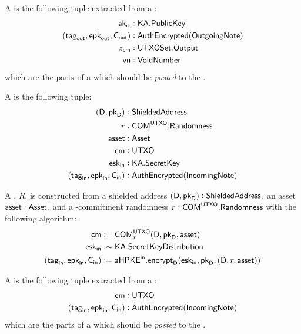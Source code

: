 \begin{definition}
    A \SenderPost{} is the following tuple extracted from a \Sender{}:
    \begin{align*}
        {\textsf{ak}}_\alpha                &: {\textsf{KA}}.{\textsf{PublicKey}} \\
        ({{\textsf{tag}}_{\textsf{out}}}, {{\textsf{epk}}_{\textsf{out}}}, {\textsf{C}_\textsf{out}}) &: {\textsf{AuthEncrypted}}({\textsf{OutgoingNote}}) \\
        z_{\textsf{cm}}                     &: {\textsf{UTXOSet}}.{\textsf{Output}} \\
        {\textsf{vn}}                       &: {\textsf{VoidNumber}}
    \end{align*}
    which are the parts of a \Sender{} which should be \emph{posted} to the \Ledger{}.
\end{definition}

\begin{definition}
    A \Receiver{} is the following tuple:
    \begin{align*}
        (\textsf{D}, {{\textsf{pk}}_\textsf{D}})     &: {\textsf{ShieldedAddress}} \\
        r                      &: {\textsf{COM}}^{\textsf{UTXO}}.{\textsf{Randomness}} \\
        {\textsf{asset}}                 &: {\textsf{Asset}} \\
        {\textsf{cm}}                    &: {\textsf{UTXO}} \\
        {{\textsf{esk}}_\textsf{in}}                 &: {\textsf{KA}}.{\textsf{SecretKey}} \\
        ({{\textsf{tag}}_\textsf{in}}, {{\textsf{epk}}_\textsf{in}}, {\textsf{C}_\textsf{in}}) &: {\textsf{AuthEncrypted}}({\textsf{IncomingNote}})
    \end{align*}
    
    A \Receiver{}, $R$, is constructed from a shielded address $(\textsf{D}, {{\textsf{pk}}_\textsf{D}}) : {\textsf{ShieldedAddress}}$, an asset ${\textsf{asset}} : {\textsf{Asset}}$, and a \UTXO{}-commitment randomness $r : {\textsf{COM}}^{\textsf{UTXO}}.{\textsf{Randomness}}$ with the following algorithm:
    \begin{align*}
        {\textsf{cm}}                    &:= {\textsf{COM}}^{{\textsf{UTXO}}}_r(\textsf{D}, {{\textsf{pk}}_\textsf{D}}, {\textsf{asset}}) \\
        {{\textsf{esk}}_\textsf{in}}                 &:\sim {\textsf{KA}}.{\textsf{SecretKeyDistribution}} \\
        ({{\textsf{tag}}_\textsf{in}}, {{\textsf{epk}}_\textsf{in}}, {\textsf{C}_\textsf{in}}) &:= {{\textsf{aHPKE}}^\textsf{in}}.{\textsf{encrypt}}_\textsf{D}({{\textsf{esk}}_\textsf{in}}, {{\textsf{pk}}_\textsf{D}}, (\textsf{D}, r, {\textsf{asset}}))
    \end{align*}
\end{definition}

\begin{definition}
    A \ReceiverPost{} is the following tuple extracted from a \Receiver{}:
    \begin{align*}
        {\textsf{cm}}                    &: {\textsf{UTXO}} \\
        ({{\textsf{tag}}_\textsf{in}}, {{\textsf{epk}}_\textsf{in}}, {\textsf{C}_\textsf{in}}) &: {\textsf{AuthEncrypted}}({\textsf{IncomingNote}})
    \end{align*}
    which are the parts of a \Receiver{} which should be \emph{posted} to the \Ledger{}.
\end{definition}


